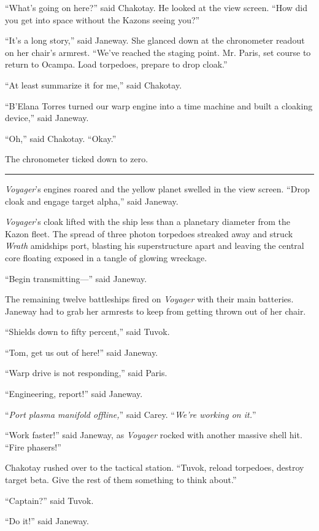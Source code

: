 \documentclass[twoside,letterpaper,12pt]{memoir}
\begin{document}
``What's going on here?'' said Chakotay. He looked at the view screen. ``How did you get into space without the Kazons seeing you?'' 

``It's a long story,'' said Janeway. She glanced down at the chronometer readout on her chair's armrest. ``We've reached the staging point. Mr. Paris, set course to return to Ocampa. Load torpedoes, prepare to drop cloak.'' 

``At least summarize it for me,'' said Chakotay. 

``B'Elana Torres turned our warp engine into a time machine and built a cloaking device,'' said Janeway. 

``Oh,'' said Chakotay. ``Okay.''

The chronometer ticked down to zero. 

\fancybreak{\rule{3cm}{0.4 pt}} 

\textit{Voyager}'s engines roared and the yellow planet swelled in the view screen. ``Drop cloak and engage target alpha,'' said Janeway. 

\textit{Voyager}'s cloak lifted with the ship less than a planetary diameter from the Kazon fleet. The spread of three photon torpedoes streaked away and struck \textit{Wrath }amidships port, blasting his superstructure apart and leaving the central core floating exposed in a tangle of glowing wreckage. 

``Begin transmitting---'' said Janeway. 

The remaining twelve battleships fired on \textit{Voyager} with their main batteries. Janeway had to grab her armrests to keep from getting thrown out of her chair. 

``Shields down to fifty percent,'' said Tuvok. 

``Tom, get us out of here!'' said Janeway. 

``Warp drive is not responding,'' said Paris. 

``Engineering, report!'' said Janeway. 

``\textit{Port plasma manifold offline,}'' said Carey. ``\textit{We're working on it.}'' 

``Work faster!'' said Janeway, as \textit{Voyager} rocked with another massive shell hit. ``Fire phasers!'' 

Chakotay rushed over to the tactical station. ``Tuvok, reload torpedoes, destroy target beta. Give the rest of them something to think about.'' 

``Captain?'' said Tuvok. 

``Do it!'' said Janeway. 
\end{document}
